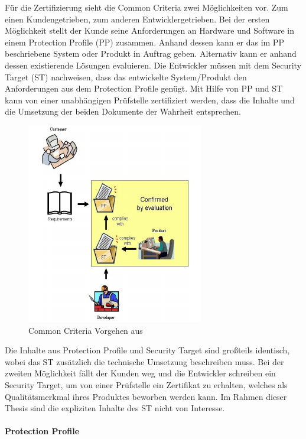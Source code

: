 \documentclass[11pt,a4paper]{report}
\begin{document}
Für die Zertifizierung sieht die Common Criteria zwei Möglichkeiten vor. Zum einen Kundengetrieben, zum anderen Entwicklergetrieben. Bei der ersten Möglichkeit stellt der Kunde seine Anforderungen an Hardware und Software in einem Protection Profile (PP) zusammen. Anhand dessen kann er das im PP beschriebene System oder Produkt in Auftrag geben. Alternativ kann er anhand dessen existierende Lösungen evaluieren. Die Entwickler müssen mit dem Security Target (ST) nachweisen, dass das entwickelte System/Produkt den Anforderungen aus dem Protection Profile genügt. Mit Hilfe von PP und ST kann von einer unabhängigen Prüfstelle zertifiziert werden, dass die Inhalte und die Umsetzung der beiden Dokumente der Wahrheit entsprechen.

\begin{figure}[htbp]
\centering
\includegraphics[scale=1.3]{images/cc_prozess.pdf}
\caption[]{Common Criteria Vorgehen aus \cite{bsi_ccguide}}
\label{fig:cc_prozess}
\end{figure}

Die Inhalte aus Protection Profile und Security Target sind großteils identisch, wobei das ST zusätzlich die technische Umsetzung beschreiben muss. Bei der zweiten Möglichkeit fällt der Kunden weg und die Entwickler schreiben ein Security Target, um von einer Prüfstelle ein Zertifikat zu erhalten, welches als Qualitätsmerkmal ihres Produktes beworben werden kann. Im Rahmen dieser Thesis sind die expliziten Inhalte des ST nicht von Interesse.

\paragraph{Protection Profile}
\end{document}
